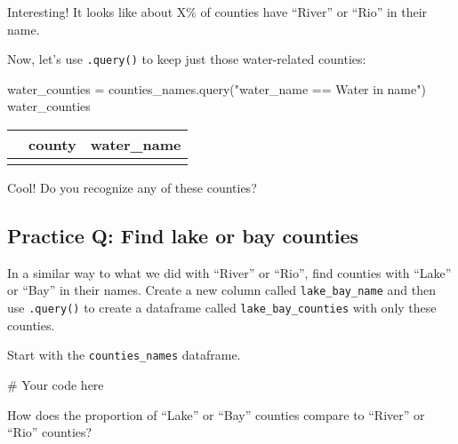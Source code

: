 \documentclass[
  letterpaper,
  DIV=11,
  numbers=noendperiod]{scrreprt}
\newenvironment{Shaded}{\begin{snugshade}}{\end{snugshade}}
\newcommand{\CommentTok}[1]{\textcolor[rgb]{0.37,0.37,0.37}{#1}}
\newcommand{\NormalTok}[1]{\textcolor[rgb]{0.00,0.23,0.31}{#1}}
\newcommand{\OperatorTok}[1]{\textcolor[rgb]{0.37,0.37,0.37}{#1}}
\newcommand{\StringTok}[1]{\textcolor[rgb]{0.13,0.47,0.30}{#1}}
\begin{document}
Interesting! It looks like about X\% of counties have ``River'' or
``Rio'' in their name.

Now, let's use \texttt{.query()} to keep just those water-related
counties:

\begin{Shaded}
\begin{Highlighting}[]
\NormalTok{water\_counties }\OperatorTok{=}\NormalTok{ counties\_names.query(}\StringTok{"water\_name == \textquotesingle{}Water in name\textquotesingle{}"}\NormalTok{)}
\NormalTok{water\_counties}
\end{Highlighting}
\end{Shaded}

\begin{longtable}[]{@{}lll@{}}
\toprule\noalign{}
& county & water\_name \\
\midrule\noalign{}
\endhead
\bottomrule\noalign{}
\endlastfoot
\end{longtable}

Cool! Do you recognize any of these counties?

\begin{tcolorbox}[enhanced jigsaw, colframe=quarto-callout-tip-color-frame, opacityback=0, titlerule=0mm, bottomrule=.15mm, breakable, leftrule=.75mm, colbacktitle=quarto-callout-tip-color!10!white, title=\textcolor{quarto-callout-tip-color}{\faLightbulb}\hspace{0.5em}{Practice}, rightrule=.15mm, coltitle=black, opacitybacktitle=0.6, colback=white, left=2mm, arc=.35mm, toptitle=1mm, bottomtitle=1mm, toprule=.15mm]

\subsection{Practice Q: Find lake or bay
counties}\label{practice-q-find-lake-or-bay-counties}

In a similar way to what we did with ``River'' or ``Rio'', find counties
with ``Lake'' or ``Bay'' in their names. Create a new column called
\texttt{lake\_bay\_name} and then use \texttt{.query()} to create a
dataframe called \texttt{lake\_bay\_counties} with only these counties.

Start with the \texttt{counties\_names} dataframe.

\begin{Shaded}
\begin{Highlighting}[]
\CommentTok{\# Your code here}
\end{Highlighting}
\end{Shaded}

How does the proportion of ``Lake'' or ``Bay'' counties compare to
``River'' or ``Rio'' counties?

\end{tcolorbox}
\end{document}
